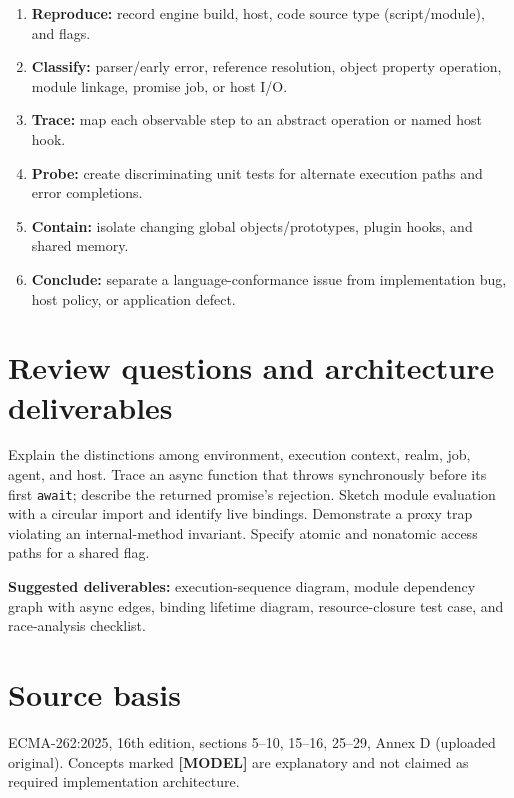\documentclass[11pt,letterpaper]{article}
\providecommand{\tightlist}{\setlength{\itemsep}{0pt}\setlength{\parskip}{0pt}}
\newcommand{\passthrough}[1]{#1}
\begin{document}
\begin{enumerate}
\def\labelenumi{\arabic{enumi}.}
\tightlist
\item
  \textbf{Reproduce:} record engine build, host, code source type (script/module), and flags.
\item
  \textbf{Classify:} parser/early error, reference resolution, object property operation, module linkage, promise job, or host I/O.
\item
  \textbf{Trace:} map each observable step to an abstract operation or named host hook.
\item
  \textbf{Probe:} create discriminating unit tests for alternate execution paths and error completions.
\item
  \textbf{Contain:} isolate changing global objects/prototypes, plugin hooks, and shared memory.
\item
  \textbf{Conclude:} separate a language-conformance issue from implementation bug, host policy, or application defect.
\end{enumerate}

\section{Review questions and architecture deliverables}\label{review-questions-and-architecture-deliverables}

Explain the distinctions among environment, execution context, realm, job, agent, and host. Trace an async function that throws synchronously before its first \passthrough{\lstinline!await!}; describe the returned promise's rejection. Sketch module evaluation with a circular import and identify live bindings. Demonstrate a proxy trap violating an internal-method invariant. Specify atomic and nonatomic access paths for a shared flag.

\textbf{Suggested deliverables:} execution-sequence diagram, module dependency graph with async edges, binding lifetime diagram, resource-closure test case, and race-analysis checklist.

\section{Source basis}\label{source-basis}

ECMA-262:2025, 16th edition, sections 5--10, 15--16, 25--29, Annex D (uploaded original). Concepts marked \textbf{{[}MODEL{]}} are explanatory and not claimed as required implementation architecture.
\end{document}
